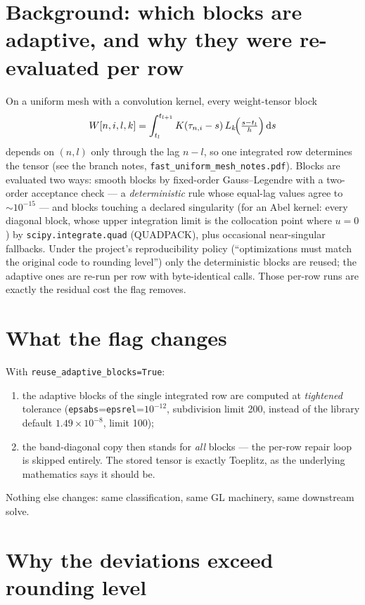 \documentclass[11pt]{article}
\newcommand{\flag}{\texttt{reuse\_adaptive\_blocks}}
\newcommand{\dd}{\,\mathrm{d}}
\begin{document}
\section{Background: which blocks are adaptive, and why they were
re-evaluated per row}

On a uniform mesh with a convolution kernel, every weight-tensor block
\[
W[n,i,l,k]=\int_{t_l}^{t_{l+1}}K(\tau_{n,i}-s)\,
L_k\!\Bigl(\tfrac{s-t_l}{h}\Bigr)\dd s
\]
depends on $(n,l)$ only through the lag $n-l$, so one integrated row
determines the tensor (see the branch notes,
\texttt{fast\_uniform\_mesh\_notes.pdf}). Blocks are evaluated two ways:
smooth blocks by fixed-order Gauss--Legendre with a two-order acceptance
check --- a \emph{deterministic} rule whose equal-lag values agree to
$\sim10^{-15}$ --- and blocks touching a declared singularity (for an
Abel kernel: every diagonal block, whose upper integration limit is the
collocation point where $u=0$) by \texttt{scipy.integrate.quad}
(QUADPACK), plus occasional near-singular fallbacks. Under the
project's reproducibility policy (``optimizations must match the
original code to rounding level'') only the deterministic blocks are
reused; the adaptive ones are re-run per row with byte-identical calls.
Those per-row runs are exactly the residual cost the flag removes.

\section{What the flag changes}

With \flag{}\texttt{=True}:
\begin{enumerate}
\item the adaptive blocks of the single integrated row are computed at
  \emph{tightened} tolerance
  (\texttt{epsabs}=\texttt{epsrel}=$10^{-12}$, subdivision limit 200,
  instead of the library default $1.49\times10^{-8}$, limit 100);
\item the band-diagonal copy then stands for \emph{all} blocks --- the
  per-row repair loop is skipped entirely. The stored tensor is exactly
  Toeplitz, as the underlying mathematics says it should be.
\end{enumerate}
Nothing else changes: same classification, same GL machinery, same
downstream solve.

\section{Why the deviations exceed rounding level}
\end{document}

